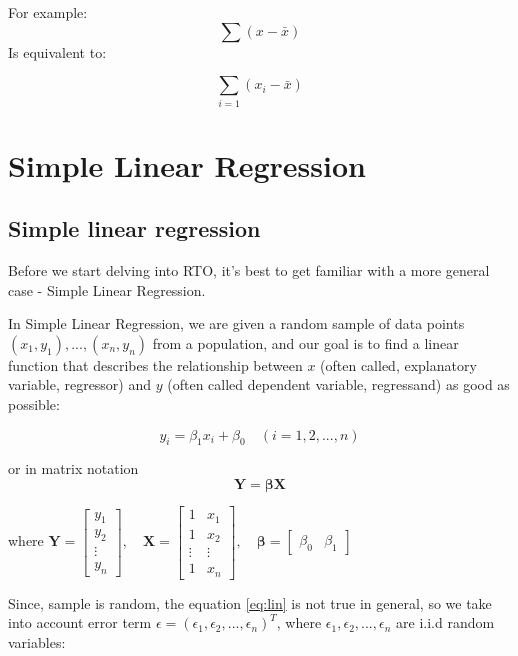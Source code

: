 \documentclass[12pt,a4paper,oneside]{book} %
\begin{document}
For example:
\[
	\sum (x-\bar{x}) 
\]
Is equivalent to:

\[
	\sum_{i=1} (x_i-\bar{x})
\]



	\chapter{Simple Linear Regression}
	
	
\section{Simple linear regression}

Before we start delving into RTO, it's best to get familiar with a more general case - Simple Linear Regression.

In Simple Linear Regression, we are given a random sample of data points $(x_1,y_1),...,(x_n,y_n)$ from a population, and our goal is to find a linear function that describes the relationship between $x$ (often called, explanatory variable, regressor) and $y$ (often called dependent variable, regressand) as good as possible: 


\begin{equation}\label{eq:lin}
	y_i = \beta_1 x_i + \beta_0 \quad (i= 1,2,...,n)
\end{equation}

or in matrix notation 
\begin{equation*}
	\mathbf{Y} = \mathbf{\beta} \mathbf{X}
\end{equation*}


where  $\mathbf{Y} = 
\begin{bmatrix}
	y_1\\
	y_2 \\
	\vdots \\
	y_n
\end{bmatrix},
\quad
\mathbf{X} = 
\begin{bmatrix}
	1 & x_1 \\
	1 & x_2 \\
	\vdots & \vdots \\
	1 & x_n
\end{bmatrix}, \quad
\mathbf{\beta} =
\begin{bmatrix}
	\beta_0 & \beta_1
\end{bmatrix}
$



Since, sample is random, the equation \eqref{eq:lin} is not true in general, so we take into account error term $\epsilon = (\epsilon_1, \epsilon_2, ... , \epsilon_n)^T$, where $\epsilon_1, \epsilon_2, ... , \epsilon_n$ are i.i.d random variables:
\end{document}
